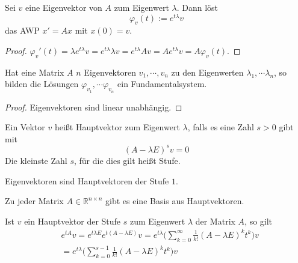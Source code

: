 \begin{Lemma}
Sei $v$ eine Eigenvektor von $A$ zum Eigenwert $\lambda$. Dann löst 
$$ \varphi_v(t) := e^{t \lambda} v$$ das AWP $x' = Ax$ mit $x(0) = v$.
\end{Lemma}
\begin{proof}
$\varphi_v'(t) =  \lambda  e^{t \lambda}  v =  e^{t\lambda}  \lambda v =  e^{t\lambda}  A v  = A e^{t\lambda}   v  = A  \varphi_v(t)$.
\end{proof}

\begin{Lemma}
Hat eine Matrix $A$ $n$ Eigenvektoren $v_1, \cdots , v_n$ zu den Eigenwerten $\lambda_1, \cdots  \lambda_n$, 
so bilden die Lösungen $ \varphi_{v_1}, \cdots  \varphi_{v_n}$ ein Fundamentalsystem.
\end{Lemma}
\begin{proof}
Eigenvektoren sind linear unabhängig.
\end{proof}


\begin{Definition}
Ein Vektor $v$ heißt Hauptvektor zum Eigenwert $\lambda$, falls es eine Zahl $s>0$ gibt mit 
$$ (A - \lambda E)^s v = 0$$
Die kleinste Zahl $s$, für die dies gilt heißt Stufe.
\end{Definition}

\begin{Bemerkung}
Eigenvektoren sind Hauptvektoren der Stufe $1$.
\end{Bemerkung}


\begin{Satz}
Zu jeder Matrix $A \in \mathbb{R}^{n \times n}$ gibt es eine Basis aus Hauptvektoren. 
\end{Satz}


\begin{Bemerkung}
Ist $v$ ein Hauptvektor der Stufe $s$ zum Eigenwert $\lambda$ der Matrix $A$, so gilt
\begin{align*}
& e^{tA}v = e^{t \lambda E} e^{t(A - \lambda E)} v = e^{t \lambda}  \biggl( \sum_{k=0}^{\infty} \frac{1}{k!} (A - \lambda E)^k t^k \biggr) v \\
& =  e^{t \lambda}  \biggl ( \sum_{k=0}^{s -1} \frac{1}{k!} (A - \lambda E)^k t^k \biggr) v 
\end{align*}
\end{Bemerkung}
